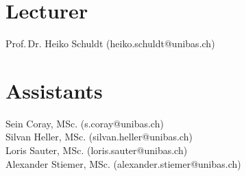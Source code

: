 \documentclass[runningheads,a4paper]{llncs}
\newenvironment{produceProceedings}{}{}
\begin{document}
\begin{produceProceedings}
	\section*{Lecturer}
	Prof.\,Dr. Heiko Schuldt (heiko.schuldt@unibas.ch)
	\section*{Assistants}
	Sein Coray, MSc. (s.coray@unibas.ch)\\
	Silvan Heller, MSc. (silvan.heller@unibas.ch)\\
	Loris Sauter, MSc. (loris.sauter@unibas.ch)\\
	Alexander Stiemer, MSc. (alexander.stiemer@unibas.ch)
	\tableofcontents
\end{produceProceedings}
	
%
\mainmatter
%


\end{document}
